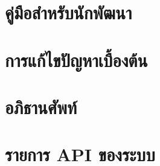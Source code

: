 \documentclass[guides]{cskkumanual}
\begin{document}
\chapter{คู่มือสำหรับนักพัฒนา}


\chapter{การแก้ไขปัญหาเบื้องต้น}


\printreferences     %

\appendix            %
\chapter{อภิธานศัพท์}


\chapter{รายการ API ของระบบ}

\end{document}
